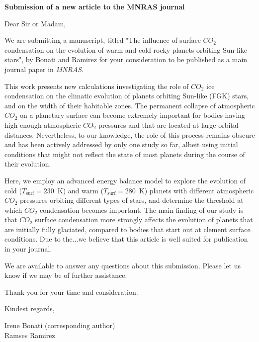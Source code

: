 \documentclass[12pt,stdletter,dateno,sigleft]{newlfm}
\begin{document}
\begin{newlfm}


\textbf{Submission of a new article to the MNRAS journal}

\vspace{0.2cm}

Dear Sir or Madam,

We are submitting a manuscript, titled "The influence of surface $CO_{\mathrm{2}}$ condensation on the evolution of warm and cold rocky planets orbiting Sun-like stars", by Bonati and Ramirez for your consideration to be published as a main journal paper in \textit{MNRAS}. 

This work presents new calculations investigating the role of $CO_{\mathrm{2}}$ ice condensation on the climatic evolution of planets orbiting Sun-like (FGK) stars, and on the width of their habitable zones. The permanent collapse of atmospheric $CO_{\mathrm{2}}$ on a planetary surface can become extremely important for bodies having high enough atmospheric $CO_{\mathrm{2}}$ pressures and that are located at large orbital distances. Nevertheless, to our knowledge, the role of this process remains obscure and has been actively addressed by only one study so far, albeit using initial conditions that might not reflect the state of most planets during the course of their evolution. 

Here, we employ an advanced energy balance model to explore the evolution of cold ($T_{\mathrm{surf}}=230$~K) and warm ($T_{\mathrm{surf}}=280$~K) planets with different atmospheric $CO_{\mathrm{2}}$ pressures orbiting different types of stars, and determine the threshold at which $CO_{\mathrm{2}}$ condensation becomes important. The main finding of our study is that $CO_{\mathrm{2}}$ surface condensation more strongly affects the evolution of planets that are initially fully glaciated, compared to bodies that start out at clement surface conditions. Due to the...we believe  that this article is well suited for publication in your journal.

We are available to answer any questions about this submission. Please let us know if we may be of further assistance.

Thank you for your time and consideration. 

Kindest regards,

Irene Bonati (corresponding author)\\
Ramses Ramirez


\end{newlfm}
\end{document}
